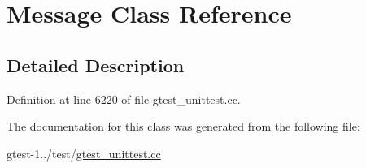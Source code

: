 \hypertarget{classmy__namespace_1_1testing_1_1Message}{\section{\-Message \-Class \-Reference}
\label{d1/d3a/classmy__namespace_1_1testing_1_1Message}
}


\subsection{\-Detailed \-Description}


\-Definition at line 6220 of file gtest\-\_\-unittest.\-cc.



\-The documentation for this class was generated from the following file\-:\begin{DoxyCompactItemize}
\item 
gtest-\/1../test/\hyperlink{gtest__unittest_8cc}{gtest\-\_\-unittest.\-cc}\end{DoxyCompactItemize}
